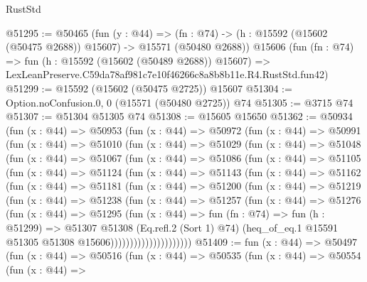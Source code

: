 \begin{lexlean}{RustStd}
\begin{coremodule}
@51295 := @50465
    (fun (y : @44) =>
    (fn : @74) -> (h : @15592 (@15602 (@50475 @2688)) @15607) -> @15571 (@50480 @2688))
    @15606
    (fun (fn : @74) =>
    fun (h : @15592 (@15602 (@50489 @2688)) @15607) =>
    LexLeanPreserve.C59da78af981c7e10f46266c8a8b8b11e.R4.RustStd.fun42)
@51299 := @15592 (@15602 (@50475 @2725)) @15607
@51304 := Option.noConfusion.{0, 0} (@15571 (@50480 @2725)) @74
@51305 := @3715 @74
@51307 := @51304 @51305 @74
@51308 := @15605 @15650
@51362 := @50934
    (fun (x : @44) =>
    @50953
      (fun (x : @44) =>
      @50972
        (fun (x : @44) =>
        @50991
          (fun (x : @44) =>
          @51010
            (fun (x : @44) =>
            @51029
              (fun (x : @44) =>
              @51048
                (fun (x : @44) =>
                @51067
                  (fun (x : @44) =>
                  @51086
                    (fun (x : @44) =>
                    @51105
                      (fun (x : @44) =>
                      @51124
                        (fun (x : @44) =>
                        @51143
                          (fun (x : @44) =>
                          @51162
                            (fun (x : @44) =>
                            @51181
                              (fun (x : @44) =>
                              @51200
                                (fun (x : @44) =>
                                @51219
                                  (fun (x : @44) =>
                                  @51238
                                    (fun (x : @44) =>
                                    @51257
                                      (fun (x : @44) =>
                                      @51276
                                        (fun (x : @44) =>
                                        @51295
                                          (fun (x : @44) =>
                                          fun (fn : @74) =>
                                          fun (h : @51299) =>
                                          @51307
                                            @51308
                                            (Eq.refl.{2} (Sort 1) @74)
                                            (heq_of_eq.{1}
                                              @15591
                                              @51305
                                              @51308
                                              @15606)))))))))))))))))))))
@51409 := fun (x : @44) =>
  @50497
    (fun (x : @44) =>
    @50516
      (fun (x : @44) =>
      @50535
        (fun (x : @44) =>
        @50554
          (fun (x : @44) =>

\end{coremodule}
\end{lexlean}
